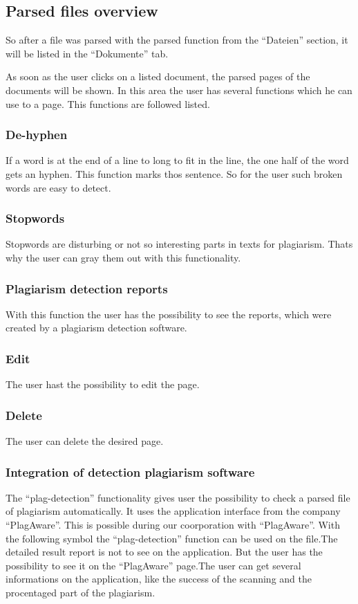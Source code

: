 \subsection{Parsed files overview}\label{sec:parse-file}

So after a file was parsed with the parsed function from the \enquote{Dateien} section, it will be listed in the 
\enquote{Dokumente} tab.

As soon as the user clicks on a listed document, the parsed pages of the documents will be shown. In this area the user has several functions which he can use to a page. This functions are followed listed.

\subsubsection{De-hyphen}
If a word is at the end of a line to long to fit in the line, the one half of the word gets an hyphen. This function marks thos sentence. So for the user such broken words are easy to detect.

\subsubsection{Stopwords}
Stopwords are disturbing or not so interesting parts in texts for plagiarism. Thats why the user can gray them out with this functionality.

\subsubsection{Plagiarism detection reports}
With this function the user has the possibility to see the reports, which were created by a plagiarism detection software.

\subsubsection{Edit}
The user hast the possibility to edit the page.
\subsubsection{Delete}
The user can delete the desired page.
\subsubsection{Integration of detection plagiarism software}

The \enquote{plag-detection} functionality gives user the possibility to check a parsed file of plagiarism automatically. 
It uses the application interface from the company \enquote{PlagAware}. This is possible during our coorporation with 
\enquote{PlagAware}.
With the following symbol the \enquote{plag-detection} function can be used on the file.The detailed result report is 
not to see on the application. But the user has the possibility to see it on the \enquote{PlagAware} page.The user can get 
several informations on the application, like the success of the scanning and the procentaged part of the plagiarism.

